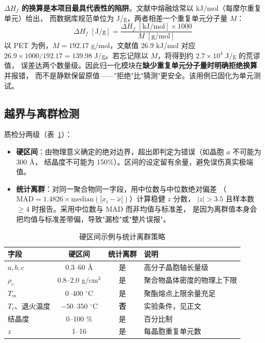 \documentclass[11pt,a4paper]{ctexart}
\begin{document}
\textbf{$\Delta H_f$ 的换算是本项目最具代表性的陷阱}。文献中熔融焓常以 kJ/mol（每摩尔重复单元）给出，
而数据库规范单位为 J/g，两者相差一个重复单元分子量 $M$：
\begin{equation}
\Delta H_f\;[\mathrm{J/g}] = \frac{\Delta H_f\;[\mathrm{kJ/mol}] \times 1000}{M\;[\mathrm{g/mol}]}
\end{equation}
以 PET 为例，$M = 192.17$ g/mol，文献值 26.9 kJ/mol 对应
$26.9\times1000/192.17 = 139.98$ J/g。若忘记除以 $M$，将得到约 $2.7\times10^4$ J/g 的荒谬值，
误差达两个数量级。因此归一化模块在\textbf{缺少重复单元分子量时明确拒绝换算}并报错，
而不是静默保留原值——"拒绝"比"猜测"更安全。该用例已固化为单元测试。

\subsection{越界与离群检测}

质检分两级（表~\ref{tab:sanity}）：
\begin{itemize}[leftmargin=2.2em]
  \item \textbf{硬区间}：由物理意义确定的绝对边界，超出即判定为错误（如晶胞 $a$ 不可能为 300 \AA，
        结晶度不可能为 150\%）。区间的设定留有余量，避免误伤真实极端值。
  \item \textbf{统计离群}：对同一聚合物同一字段，用中位数与中位数绝对偏差
        （$\mathrm{MAD} = 1.4826\times \mathrm{median}(|x_i - \tilde{x}|)$）计算稳健 $z$ 分数，
        $|z| > 3.5$ 且样本数 $\geq 4$ 时报告。采用中位数与 MAD 而非均值与标准差，
        是因为离群值本身会把均值与标准差带偏，导致"漏检"或"整片误报"。
\end{itemize}

\begin{table}[htbp]
\centering
\caption{硬区间示例与统计离群策略}
\label{tab:sanity}
\begin{tabularx}{\textwidth}{l c c X}
\toprule
字段 & 硬区间 & 统计离群 & 说明\\
\midrule
$a,b,c$ & 0.3--60 \AA & 是 & 高分子晶胞轴长量级\\
$\rho_c$ & 0.8--2.0 g/cm$^3$ & 是 & 聚合物晶体密度的物理上下限\\
$T_m$ & 0--400 $^\circ$C & 是 & 聚酯熔点上限余量充足\\
$T_c$、退火温度 & $-50$--350 $^\circ$C & \textbf{否} & 实验条件，见正文\\
结晶度 & 0--100 \% & 是 & 百分比制\\
$z$ & 1--16 & 是 & 每晶胞重复单元数\\
\bottomrule
\end{tabularx}
\end{table}
\end{document}
